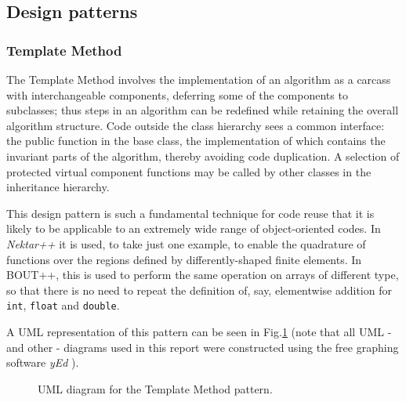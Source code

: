 \subsection{Design patterns}\label{sec:design_pattern_individual_proxyapps}
\subsubsection{Template Method}\label{sec:template}

The Template Method involves the implementation of an algorithm as a carcass with interchangeable components, deferring some of the components to subclasses; thus steps in an algorithm can be redefined while retaining the overall algorithm structure.  
Code outside the class hierarchy sees a common interface: the public function in the base class, the implementation of which contains the invariant parts of the algorithm, thereby avoiding code duplication.  
A selection of protected virtual component functions may be called by other classes in the inheritance hierarchy. 

This design pattern is such a fundamental technique for code reuse that it is likely to be applicable to an extremely wide range of object-oriented codes.  
In {\it Nektar++} it is used, to take just one example, to enable the quadrature of functions over the regions defined by differently-shaped finite elements.
In BOUT++, this is used to perform the same operation on arrays of different type, so that there is no need to repeat the definition of, say, elementwise addition for \texttt{int}, \texttt{float} and \texttt{double}.

A UML representation of this pattern can be seen in Fig.\ref{fig:templatemethoduml} (note that all UML - and other - diagrams used in this report were constructed using the free graphing software {\it yEd} \cite{yedwebsite}).

\begin{figure}
\centerline{}
\caption{\label{fig:templatemethoduml}
UML diagram for the Template Method pattern.}
\end{figure}

